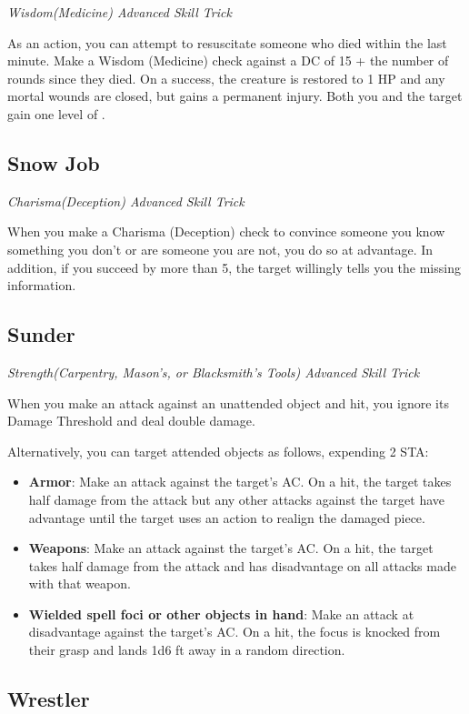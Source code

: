 \textit{Wisdom(Medicine) Advanced Skill Trick}

As an action, you can attempt to resuscitate someone who died within the last minute. Make a Wisdom (Medicine) check against a DC of 15 + the number of rounds since they died. On a success, the creature is restored to 1 HP and any mortal wounds are closed, but gains a permanent injury. Both you and the target gain one level of . 

\subsection{Snow Job}

\textit{Charisma(Deception) Advanced Skill Trick}

When you make a Charisma (Deception) check to convince someone you know something you don't or are someone you are not, you do so at advantage. In addition, if you succeed by more than 5, the target willingly tells you the missing information.

\subsection{Sunder}

\textit{Strength(Carpentry, Mason's, or Blacksmith's Tools) Advanced Skill Trick}

When you make an attack against an unattended object and hit, you ignore its Damage Threshold and deal double damage. 

Alternatively, you can target attended objects as follows, expending 2 STA:
\begin{itemize}
	\item \textbf{Armor}: Make an attack against the target's AC. On a hit, the target takes half damage from the attack but any other attacks against the target have advantage until the target uses an action to realign the damaged piece.
	\item \textbf{Weapons}: Make an attack against the target's AC. On a hit, the target takes half damage from the attack and has disadvantage on all attacks made with that weapon.
	\item \textbf{Wielded spell foci or other objects in hand}: Make an attack at disadvantage against the target's AC. On a hit, the focus is knocked from their grasp and lands 1d6  ft away in a random direction.
\end{itemize}

\subsection{Wrestler}

